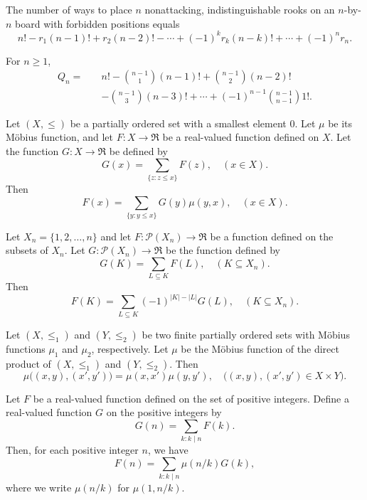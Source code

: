 \begin{theorem}
    \label{thm:6.4.1}
The number of ways to place $n$ nonattacking, indistinguishable rooks on an $n$-by-$n$ board with forbidden positions equals
\[
n! - r_1 (n-1)! + r_2 (n-2)! - \cdots + (-1)^k r_k (n-k)! + \cdots + (-1)^n r_n.
\]
\end{theorem}

\begin{theorem}
    \label{thm:6.5.1}
For $n \geq 1$,
\begin{align*}
    Q_n = \quad & n! - \binom{n-1}{1}(n-1)! + \binom{n-1}{2}(n-2)! \\
    & - \binom{n-1}{3}(n-3)! + \cdots + (-1)^{n-1} \binom{n-1}{n-1}1!.
\end{align*}

\end{theorem}

\begin{theorem}
    \label{thm:6.6.1}
Let $(X, \leq)$ be a partially ordered set with a smallest element $0$. Let $\mu$ be its Möbius function, and let $F : X \to \Re$ be a real-valued function defined on $X$. Let the function $G : X \to \Re$ be defined by
\[
G(x) = \sum_{\{z : z \leq x\}} F(z), \quad (x \in X).
\]
Then
\[
F(x) = \sum_{\{y : y \leq x\}} G(y) \mu(y, x), \quad (x \in X).
\]
\end{theorem}

\begin{corollary}
    \label{cor: 6.6.2}
Let $X_n = \{1, 2, \ldots, n\}$ and let $F : \mathcal{P}(X_n) \to \Re$ be a function defined on the subsets of $X_n$. Let $G : \mathcal{P}(X_n) \to \Re$ be the function defined by
\[
G(K) = \sum_{L \subseteq K} F(L), \quad (K \subseteq X_n).
\]
Then
\[
F(K) = \sum_{L \subseteq K} (-1)^{|K| - |L|} G(L), \quad (K \subseteq X_n).
\]
\end{corollary}

\begin{theorem}
    \label{thm:6.6.3}
Let $(X, \leq_1)$ and $(Y, \leq_2)$ be two finite partially ordered sets with Möbius functions $\mu_1$ and $\mu_2$, respectively. Let $\mu$ be the Möbius function of the direct product of $(X, \leq_1)$ and $(Y, \leq_2)$. Then
\[
\mu\big((x, y), (x', y')\big) = \mu(x, x') \mu(y, y'), \quad \big((x, y), (x', y') \in X \times Y\big).
\tag{6.29}
\]
\end{theorem}

\begin{theorem}
    \label{thm:6.6.4}
Let $F$ be a real-valued function defined on the set of positive integers. Define a real-valued function $G$ on the positive integers by
\[
G(n) = \sum_{k : k \mid n} F(k).
\]
Then, for each positive integer $n$, we have
\[
F(n) = \sum_{k : k \mid n} \mu\left(n/k \right) G(k),
\]
where we write $\mu(n/k)$ for $\mu(1, n/k)$.
\end{theorem}


